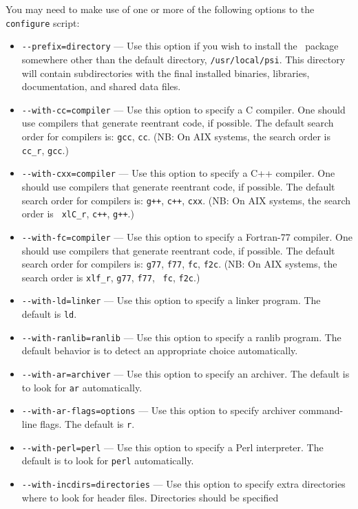\documentclass[12pt]{article}
\begin{document}
\noindent
You may need to make use of one or more of the following options to
the {\tt configure} script:
\begin{itemize}
\item {\tt -}{\tt -prefix=directory} --- Use this option if you wish to
  install the \PSIthree\ package somewhere other than the default
  directory, {\tt /usr/local/psi}.  This directory will contain
  subdirectories with the final installed binaries, libraries, 
  documentation, and shared data files.
\item {\tt -}{\tt -with-cc=compiler} --- Use this option to specify a C
  compiler.  One should use compilers that generate reentrant code,
  if possible. The default search order for compilers is: {\tt gcc},
  {\tt cc}.  (NB: On AIX systems, the search order is {\tt
  cc\_r}, {\tt gcc}.)
\item {\tt -}{\tt -with-cxx=compiler} --- Use this option to specify a C++
  compiler.  One should use compilers that generate reentrant code,
  if possible. The default search order for compilers is: {\tt g++},
  {\tt c++}, {\tt cxx}.  (NB: On AIX systems, the search order is {\tt
  xlC\_r}, {\tt c++}, {\tt g++}.)
\item {\tt -}{\tt -with-fc=compiler} --- Use this option to specify a
  Fortran-77 compiler.  One should use compilers that generate reentrant code,
  if possible. The default search order for compilers is:
  {\tt g77}, {\tt f77}, {\tt fc}, {\tt f2c}.  (NB: On AIX systems, the
  search order is {\tt xlf\_r}, {\tt g77}, {\tt f77}, {\tt
  fc}, {\tt f2c}.)
\item {\tt -}{\tt -with-ld=linker} --- Use this option to specify
  a linker program. The default is {\tt ld}.
\item {\tt -}{\tt -with-ranlib=ranlib} --- Use this option to specify
  a ranlib program. The default behavior is to detect an appropriate
  choice automatically.
\item {\tt -}{\tt -with-ar=archiver} --- Use this option to specify an
  archiver.  The default is to look for {\tt ar} automatically.
\item {\tt -}{\tt -with-ar-flags=options} --- Use this option to specify
  archiver command-line flags. The default is {\tt r}.
\item {\tt -}{\tt -with-perl=perl} --- Use this option to specify a
  Perl interpreter.  The default is to look for {\tt perl} automatically.
\item {\tt -}{\tt -with-incdirs=directories} --- Use this option to specify extra
  directories where to look for header files. Directories should be specified

\end{itemize}
\end{document}
